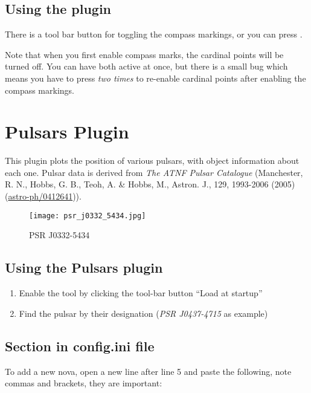 \subsection{Using the plugin}
\label{sec:plugins:CompassMarks:using}

There is a tool bar button for toggling the compass markings, or you can
press .

Note that when you first enable compass marks, the cardinal points will
be turned off. You can have both active at once, but there is a small
bug which means you have to press  \emph{two times} to
re-enable cardinal points after enabling the compass markings.

\section{Pulsars Plugin}
\label{sec:plugins:Pulsars}

This plugin plots the position of various pulsars, with object information about each one. Pulsar data is derived from \textit{The ATNF Pulsar Catalogue} (Manchester, R. N., Hobbs, G. B., Teoh, A. \& Hobbs, M., Astron. J., 129, 1993-2006 (2005) (\href{http://arxiv.org/abs/astro-ph/0412641}{astro-ph/0412641})).

\begin{figure}[h]
\texttt{[image: psr\_j0332\_5434.jpg]}
\label{fig:PSR_J0332-5434}
\caption{PSR J0332-5434}
\end{figure}

\subsection{Using the Pulsars plugin}
\label{sec:plugins:Pulsars:using}

\begin{enumerate}
\item Enable the tool by clicking the tool-bar button ``Load at startup''
\item Find the pulsar by their designation (\emph{PSR J0437-4715} as example)
\end{enumerate}

\subsection{Section  in config.ini file}
\label{sec:plugins:Pulsars:config}

To add a new nova, open a new line after line 5 and paste the following, note commas and brackets, they are important:

